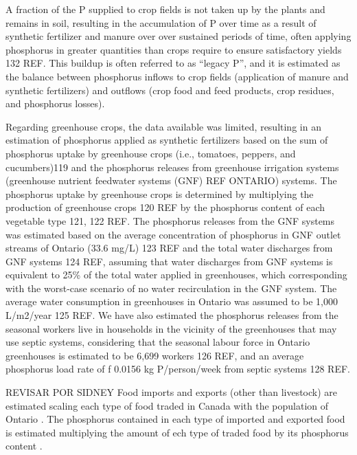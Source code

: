 \documentclass[authoryear]{elsarticle}
\begin{document}
A fraction of the P supplied to crop fields is not taken up by the plants and remains in soil, resulting in the accumulation of P over time as a result of synthetic fertilizer and manure over over sustained periods of time, often applying phosphorus in greater quantities than crops require to ensure satisfactory yields 132 REF. This buildup is often referred to as “legacy P”, and it is estimated as the balance between phosphorus inflows to crop fields (application of manure and synthetic fertilizers) and outflows (crop food and feed products, crop residues, and phosphorus losses).

Regarding greenhouse crops, the data available was limited, resulting in an estimation of phosphorus applied as synthetic fertilizers based on the sum of phosphorus uptake by greenhouse crops (i.e., tomatoes, peppers, and cucumbers)119 and the phosphorus releases from greenhouse irrigation systems (greenhouse nutrient feedwater systems (GNF) REF ONTARIO) systems. The phosphorus uptake by greenhouse crops is determined by multiplying the production of greenhouse crops 120 REF by the phosphorus content of each vegetable type 121, 122 REF. The phosphorus releases from the GNF systems was estimated based on the average concentration of phosphorus in GNF outlet streams of Ontario (33.6 mg/L) 123 REF and the total water discharges from GNF systems 124 REF, assuming that water discharges from GNF systems is equivalent to 25\% of the total water applied in greenhouses, which corresponding with the worst-case scenario of no water recirculation in the GNF system. The average water consumption in greenhouses in Ontario was assumed to be 1,000 L/m2/year 125 REF. We have also estimated the phosphorus releases from the seasonal workers live in households in the vicinity of the greenhouses that may use septic systems, considering that the seasonal labour force in Ontario greenhouses is estimated to be 6,699 workers 126 REF, and an average phosphorus load rate of f 0.0156 kg P/person/week from septic systems 128 REF.

{\color{red} REVISAR POR SIDNEY Food imports and exports (other than livestock)
are estimated scaling each type of food 
traded in Canada \citep{TradeDataOnlineCanada}
with the population of Ontario \citep{PopulationCanada}.
The phosphorus contained in each type of imported and exported food is estimated multiplying the amount of ech type of traded food by its phosphorus content \citep{CanadianNutrientFile}.
}
\end{document}
